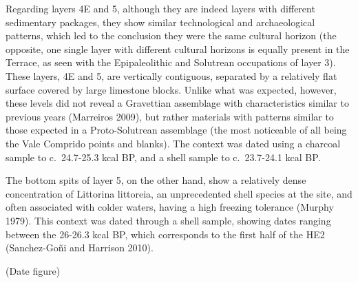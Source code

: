 \documentclass[12pt,twoside]{reedthesis}
\begin{document}
Regarding layers 4E and 5, although they are indeed layers with different sedimentary packages, they show similar technological and archaeological patterns, which led to the conclusion they were the same cultural horizon (the opposite, one single layer with different cultural horizons is equally present in the Terrace, as seen with the Epipaleolithic and Solutrean occupations of layer 3). These layers, 4E and 5, are vertically contiguous, separated by a relatively flat surface covered by large limestone blocks. Unlike what was expected, however, these levels did not reveal a Gravettian assemblage with characteristics similar to previous years (Marreiros 2009), but rather materials with patterns similar to those expected in a Proto-Solutrean assemblage (the most noticeable of all being the Vale Comprido points and blanks). The context was dated using a charcoal sample to c.~24.7-25.3 kcal BP, and a shell sample to c.~23.7-24.1 kcal BP.

The bottom spits of layer 5, on the other hand, show a relatively dense concentration of Littorina littoreia, an unprecedented shell species at the site, and often associated with colder waters, having a high freezing tolerance (Murphy 1979). This context was dated through a shell sample, showing dates ranging between the 26-26.3 kcal BP, which corresponds to the first half of the HE2 (Sanchez-Goñi and Harrison 2010).

(Date figure)
\end{document}
